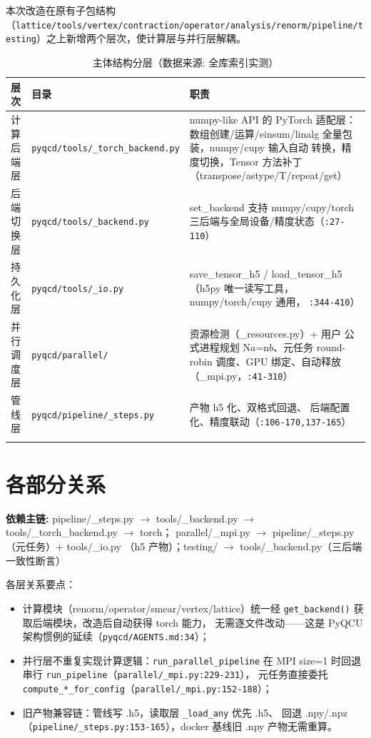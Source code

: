 \documentclass[UTF8]{ctexart}
\begin{document}
本次改造在原有子包结构（\texttt{\nolinkurl{lattice/tools/vertex/contraction/operator/analysis/renorm/pipeline/testing}}）之上新增两个层次，使计算层与并行层解耦。

\begin{xltabular}{\textwidth}{llX}
\toprule
\textcolor{struct}{层次} & 目录 & \textcolor{struct}{职责} \\
\midrule
\endhead
计算后端层 & \texttt{\nolinkurl{pyqcd/tools/_torch_backend.py}} & numpy-like API 的
PyTorch 适配层：数组创建/运算/einsum/linalg 全量包装，numpy/cupy 输入自动
转换，精度切换，Tensor 方法补丁（transpose/astype/T/repeat/get） \\
后端切换层 & \texttt{\nolinkurl{pyqcd/tools/_backend.py}} & set\_backend 支持
numpy/cupy/torch 三后端与全局设备/精度状态（\texttt{\nolinkurl{:27-110}}） \\
持久化层 & \texttt{\nolinkurl{pyqcd/tools/_io.py}} & save\_tensor\_h5 /
load\_tensor\_h5（h5py 唯一读写工具，numpy/torch/cupy 通用，
\texttt{\nolinkurl{:344-410}}） \\
并行调度层 & \texttt{\nolinkurl{pyqcd/parallel/}} & 资源检测（\_resources.py）+ 用户
公式进程规划 N$a$=n$b$、元任务 round-robin 调度、GPU 绑定、自动释放
（\_mpi.py，\texttt{\nolinkurl{:41-310}}） \\
管线层 & \texttt{\nolinkurl{pyqcd/pipeline/_steps.py}} & 产物 h5 化、双格式回退、
后端配置化、精度联动（\texttt{\nolinkurl{:106-170,137-165}}） \\
\bottomrule
\caption{主体结构分层（数据来源: 全库索引实测）}
\end{xltabular}

\section{各部分关系}

\begin{keybox}
\textbf{依赖主链:} \textcolor{relation}{pipeline/\_steps.py $\rightarrow$
tools/\_backend.py $\rightarrow$ tools/\_torch\_backend.py $\rightarrow$ torch；
parallel/\_mpi.py $\rightarrow$ pipeline/\_steps.py（元任务）+ tools/\_io.py
（h5 产物）；testing/ $\rightarrow$ tools/\_backend.py（三后端一致性断言）}
\end{keybox}

各层关系要点：
\begin{itemize}
\item 计算模块（renorm/operator/smear/vertex/lattice）统一经
\texttt{\nolinkurl{get_backend()}} 获取后端模块，改造后自动获得 torch 能力，
无需逐文件改动——这是 PyQCU 架构惯例的延续（\texttt{\nolinkurl{pyqcd/AGENTS.md:34}}）；
\item 并行层不重复实现计算逻辑：\texttt{\nolinkurl{run_parallel_pipeline}} 在
MPI size=1 时回退串行 \texttt{\nolinkurl{run_pipeline}}（\texttt{\nolinkurl{parallel/_mpi.py:229-231}}），
元任务直接委托 \texttt{\nolinkurl{compute_*_for_config}}（\texttt{\nolinkurl{parallel/_mpi.py:152-188}}）；
\item 旧产物兼容链：管线写 .h5，读取层 \texttt{\nolinkurl{_load_any}} 优先 .h5、
回退 .npy/.npz（\texttt{\nolinkurl{pipeline/_steps.py:153-165}}），docker 基线旧
.npy 产物无需重算。
\end{itemize}
\end{document}

